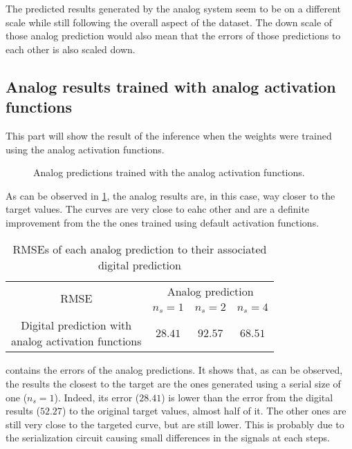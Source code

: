 The predicted results generated by the analog system seem to be on a different scale while still following the overall aspect of the dataset. The down scale of those analog prediction would also mean that the errors of those predictions to each other is also scaled down.

\subsection{Analog results trained with analog activation functions}

This part will show the result of the inference when the weights were trained using the analog activation functions.

\begin{figure}[H]
  \centering
  
  \caption{Analog predictions trained with the analog activation functions.}
  \label{graph:airlineAnalog}
\end{figure}

As can be observed in \cref{graph:airlineAnalog}, the analog results are, in this case, way closer to the target values. The curves are very close to eahc other and are a definite improvement from the the ones trained using default activation functions.

\begin{table}[H]
  \centering
  \begin{tabular}{|c|c|c|c|}
    \hline
    \multirow{2}{*}{\acs{RMSE}} & \multicolumn{3}{|c|}{Analog prediction}\\
    \cline{2-4}
    & $n_s=1$ & $n_s=2$ & $n_s=4$ \\
    \hline
    \specialcell{Digital prediction with\\analog activation functions} & $28.41$ & $92.57$ & $68.51$\\
    \hline
  \end{tabular}
  \caption{\acp{RMSE} of each analog prediction to their associated digital prediction}
  \label{tab:airlineAnalog}
\end{table}

 contains the errors of the analog predictions. It shows that, as can be observed, the results the closest to the target are the ones generated using a serial size of one ($n_s=1$). Indeed, its error ($28.41$) is lower than the error from the digital results ($52.27$) to the original target values, almost half of it. The other ones are still very close to the targeted curve, but are still lower. This is probably due to the serialization circuit causing small differences in the signals at each steps.

